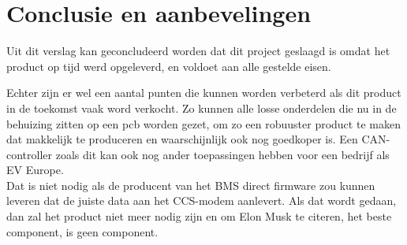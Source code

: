 \chapter{Conclusie en aanbevelingen}
\label{Conclusie_en_aanbevelingen}

Uit dit verslag kan geconcludeerd worden dat dit project geslaagd is omdat het
product op tijd werd opgeleverd, en voldoet aan alle gestelde eisen.

Echter zijn er wel een aantal punten die kunnen worden verbeterd als dit
product in de toekomst vaak word verkocht. Zo kunnen alle losse onderdelen die
nu in de behuizing zitten op een pcb worden gezet, om zo een robuuster product
te maken dat makkelijk te produceren en waarschijnlijk ook nog goedkoper is.
Een CAN-controller zoals dit kan ook nog ander toepassingen hebben voor een
bedrijf als EV Europe.\\

Dat is niet nodig als de producent van het BMS direct firmware zou kunnen
leveren dat de juiste data aan het CCS-modem aanlevert. Als dat wordt gedaan,
dan zal het product niet meer nodig zijn en om Elon Musk te citeren, het beste
component, is geen component.

